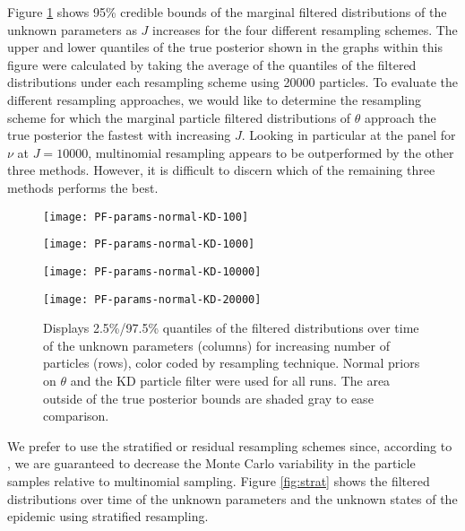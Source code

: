 \documentclass{elsarticle}
\begin{document}
Figure \ref{fig:resamp} shows 95\% credible bounds of the marginal filtered distributions of the unknown parameters as $J$ increases for the four different resampling schemes.  The upper and lower quantiles of the true posterior shown in the graphs within this figure were calculated by taking the average of the quantiles of the filtered distributions under each resampling scheme using 20000 particles.  To evaluate the different resampling approaches, we would like to determine the resampling scheme for which the marginal particle filtered distributions of $\theta$ approach the true posterior the fastest with increasing $J$.  Looking in particular at the panel for $\nu$ at $J = 10000$, multinomial resampling appears to be outperformed by the other three methods.  However, it is difficult to discern which of the remaining three methods performs the best.

\begin{figure}[ht]
\centering
\begin{minipage}{1.0\linewidth}
\texttt{[image: PF-params-normal-KD-100]}
\end{minipage}
\begin{minipage}{1.0\linewidth}
\texttt{[image: PF-params-normal-KD-1000]}
\end{minipage}
\begin{minipage}{1.0\linewidth}
\texttt{[image: PF-params-normal-KD-10000]}
\end{minipage}
\begin{minipage}{1.0\linewidth}
\texttt{[image: PF-params-normal-KD-20000]}
\end{minipage}
\caption{Displays 2.5\%/97.5\% quantiles of the filtered distributions over time of the unknown parameters (columns) for increasing number of particles (rows), color coded by resampling technique.  Normal priors on $\theta$ and the KD particle filter were used for all runs.  The area outside of the true posterior bounds are shaded gray to ease comparison.} \label{fig:resamp}
\end{figure}

We prefer to use the stratified or residual resampling schemes since, according to \cite{Douc:Capp:Moul:comp:2005}, we are guaranteed to decrease the Monte Carlo variability in the particle samples relative to multinomial sampling.  Figure \ref{fig:strat} shows the filtered distributions over time of the unknown parameters and the unknown states of the epidemic using stratified resampling.
\end{document}
